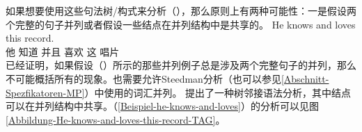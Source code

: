 \begin{exe}
\begin{xlist}[iv.]
\begin{exe}
\begin{xlist}[iv.]
如果想要使用这些句法树/构式来分析（），那么原则上有两种可能性：一是假设两个完整的句子并列或者假设一些结点在并列结构中是共享的。
\ea
\label{Beispiel-he-knows-and-loves}
\gll He knows and loves this record.\\
     他 知道 并且 喜欢 这 唱片\\
\z
%
%
%
 \citet{Abeille2006a}已经证明，如果假设（）所示的那些并列例子总是涉及两个完整句子的并列，那么不可能概括所有的现象。也需要允许Steedman分析（也可以参见\ref{Abschnitt-Spezfikatoren-MP}）中使用的词汇并列。 \citet{SJ96a}提出了一种树邻接语法分析\indextag，其中结点可以在并列结构中共享。（\ref{Beispiel-he-knows-and-loves}）的分析可以见图\vref{Abbildung-He-knows-and-loves-this-record-TAG}。

\end{xlist}
\end{exe}
\end{xlist}
\end{exe}
